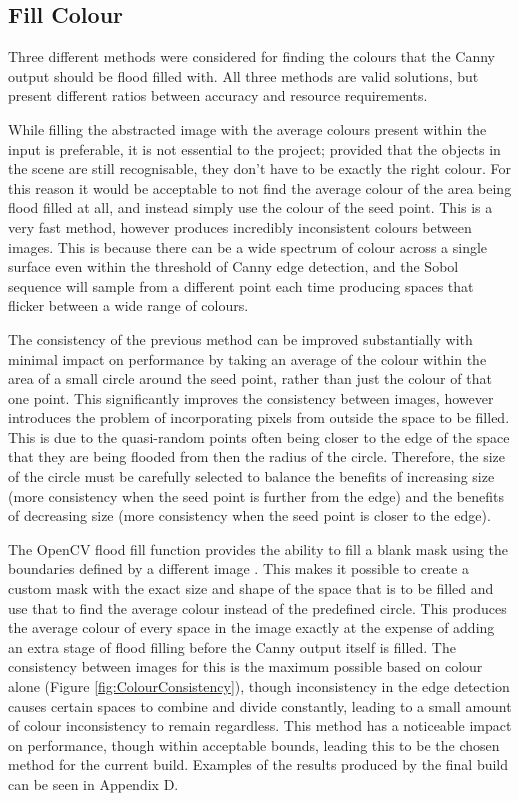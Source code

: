 \subsection{Fill Colour}

Three different methods were considered for finding the colours that the Canny output should be flood filled with. All three methods are valid solutions, but present different ratios between accuracy and resource requirements.

While filling the abstracted image with the average colours present within the input is preferable, it is not essential to the project; provided that the objects in the scene are still recognisable, they don't have to be exactly the right colour. For this reason it would be acceptable to not find the average colour of the area being flood filled at all, and instead simply use the colour of the seed point. This is a very fast method, however produces incredibly inconsistent colours between images. This is because there can be a wide spectrum of colour across a single surface even within the threshold of Canny edge detection, and the Sobol sequence will sample from a different point each time producing spaces that flicker between a wide range of colours.

The consistency of the previous method can be improved substantially with minimal impact on performance by taking an average of the colour within the area of a small circle around the seed point, rather than just the colour of that one point. This significantly improves the consistency between images, however introduces the problem of incorporating pixels from outside the space to be filled. This is due to the quasi-random points often being closer to the edge of the space that they are being flooded from then the radius of the circle. Therefore, the size of the circle must be carefully selected to balance the benefits of increasing size (more consistency when the seed point is further from the edge) and the benefits of decreasing size (more consistency when the seed point is closer to the edge). 

The OpenCV flood fill function provides the ability to fill a blank mask using the boundaries defined by a different image \cite{bradski2008learning}. This makes it possible to create a custom mask with the exact size and shape of the space that is to be filled and use that to find the average colour instead of the predefined circle. This produces the average colour of every space in the image exactly at the expense of adding an extra stage of flood filling before the Canny output itself is filled. The consistency between images for this is the maximum possible based on colour alone (Figure \ref{fig:ColourConsistency}), though inconsistency in the edge detection causes certain spaces to combine and divide constantly, leading to a small amount of colour inconsistency to remain regardless. This method has a noticeable impact on performance, though within acceptable bounds, leading this to be the chosen method for the current build. Examples of the results produced by the final build can be seen in Appendix D.

